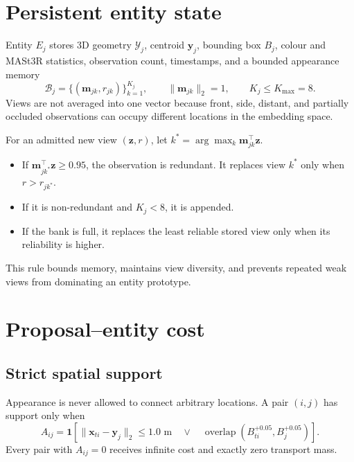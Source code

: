 \documentclass[11pt]{article}
\newcommand{\1}{\bm{1}}
\begin{document}
\section{Persistent entity state}

Entity $E_j$ stores 3D geometry $\mathcal{Y}_j$, centroid $\bm{y}_j$, bounding
box $B_j$, colour and MASt3R statistics, observation count, timestamps, and a
bounded appearance memory
\begin{equation}
\mathcal{B}_j=\{(\bm{m}_{jk},r_{jk})\}_{k=1}^{K_j},
\qquad \|\bm{m}_{jk}\|_2=1,\qquad K_j\leq K_{\max}=8.
\end{equation}
Views are not averaged into one vector because front, side, distant, and
partially occluded observations can occupy different locations in the embedding
space.

For an admitted new view $(\bm z,r)$, let
$k^*=\arg\max_k\bm m_{jk}^{\top}\bm z$.
\begin{itemize}[leftmargin=*]
    \item If $\bm m_{jk^*}^{\top}\bm z\geq0.95$, the observation is redundant.
          It replaces view $k^*$ only when $r>r_{jk^*}$.
    \item If it is non-redundant and $K_j<8$, it is appended.
    \item If the bank is full, it replaces the least reliable stored view only
          when its reliability is higher.
\end{itemize}
This rule bounds memory, maintains view diversity, and prevents repeated weak
views from dominating an entity prototype.

\section{Proposal--entity cost}

\subsection{Strict spatial support}

Appearance is never allowed to connect arbitrary locations. A pair $(i,j)$ has
support only when
\begin{equation}
A_{ij}=\1\!\left[
\|\bm{x}_{ti}-\bm{y}_j\|_2\leq1.0\text{ m}
\quad\lor\quad
\operatorname{overlap}(B_{ti}^{+0.05},B_j^{+0.05})
\right].
\label{eq:support}
\end{equation}
Every pair with $A_{ij}=0$ receives infinite cost and exactly zero transport
mass.
\end{document}
